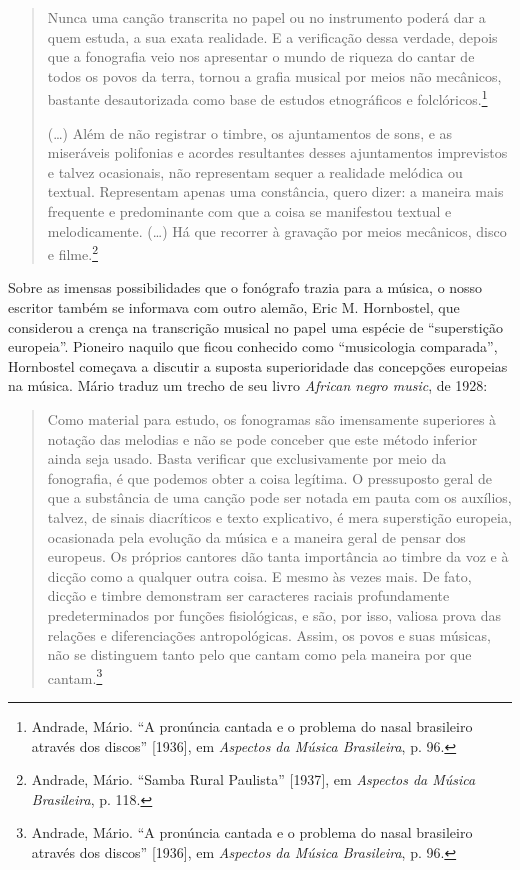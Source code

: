 \begin{quote}
Nunca uma canção transcrita no papel ou no instrumento poderá dar a quem
estuda, a sua exata realidade. E a verificação dessa verdade, depois que
a fonografia veio nos apresentar o mundo de riqueza do cantar de todos
os povos da terra, tornou a grafia musical por meios não mecânicos,
bastante desautorizada como base de estudos etnográficos e
folclóricos.\footnote{Andrade, Mário. ``A pronúncia cantada e o problema
  do nasal brasileiro através dos discos'' {[}1936{]}, em \emph{Aspectos
  da Música Brasileira}, p. 96.}

(\ldots{}) Além de não registrar o timbre, os ajuntamentos de sons, e as miseráveis
polifonias e acordes resultantes desses ajuntamentos imprevistos e
talvez ocasionais, não representam sequer a realidade melódica ou
textual. Representam apenas uma constância, quero dizer: a maneira mais
frequente e predominante com que a coisa se manifestou textual e
melodicamente. (\ldots{}) Há que recorrer à gravação por meios mecânicos,
disco e filme.\footnote{Andrade, Mário. ``Samba Rural Paulista''
  {[}1937{]}, em \emph{Aspectos da Música Brasileira}, p. 118.}
\end{quote}

Sobre as imensas possibilidades que o fonógrafo trazia para a música, o
nosso escritor também se informava com outro alemão, Eric M. Hornbostel,
que considerou a crença na transcrição musical no papel uma espécie de
``superstição europeia''. Pioneiro naquilo que ficou conhecido como
``musicologia comparada'', Hornbostel começava a discutir a suposta
superioridade das concepções europeias na música. Mário traduz um trecho
de seu livro \emph{African negro music}, de 1928:

\begin{quote}
Como material para estudo, os fonogramas são imensamente superiores à
notação das melodias e não se pode conceber que este método inferior
ainda seja usado. Basta verificar que exclusivamente por meio da
fonografia, é que podemos obter a coisa legítima. O pressuposto geral de
que a substância de uma canção pode ser notada em pauta com os auxílios,
talvez, de sinais diacríticos e texto explicativo, é mera superstição
europeia, ocasionada pela evolução da música e a maneira geral de pensar
dos europeus. Os próprios cantores dão tanta importância ao timbre da
voz e à dicção como a qualquer outra coisa. E mesmo às vezes mais. De
fato, dicção e timbre demonstram ser caracteres raciais profundamente
predeterminados por funções fisiológicas, e são, por isso, valiosa prova
das relações e diferenciações antropológicas. Assim, os povos e suas
músicas, não se distinguem tanto pelo que cantam como pela maneira por
que cantam.\footnote{Andrade, Mário. ``A pronúncia cantada e o problema
  do nasal brasileiro através dos discos'' {[}1936{]}, em \emph{Aspectos
  da Música Brasileira}, p. 96.}
\end{quote}

